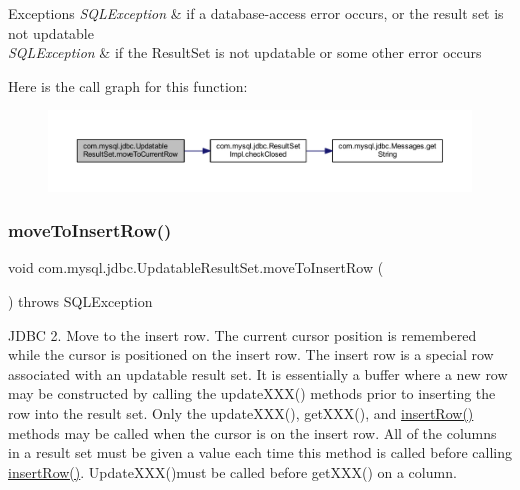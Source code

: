 \begin{DoxyExceptions}{Exceptions}
{\em S\+Q\+L\+Exception} & if a database-\/access error occurs, or the result set is not updatable \\
\hline
{\em S\+Q\+L\+Exception} & if the Result\+Set is not updatable or some other error occurs \\
\hline
\end{DoxyExceptions}
Here is the call graph for this function\+:
\nopagebreak
\begin{figure}[H]
\begin{center}
\leavevmode
\includegraphics[width=350pt]{classcom_1_1mysql_1_1jdbc_1_1_updatable_result_set_aaae4d889848e114324a20bb5badc6c89_cgraph}
\end{center}
\end{figure}
\mbox{\label{classcom_1_1mysql_1_1jdbc_1_1_updatable_result_set_a46ec028d5e4a8f1ca9541177fef43545}} 
\subsubsection{\texorpdfstring{move\+To\+Insert\+Row()}{moveToInsertRow()}}
{\footnotesize\ttfamily void com.\+mysql.\+jdbc.\+Updatable\+Result\+Set.\+move\+To\+Insert\+Row (\begin{DoxyParamCaption}{ }\end{DoxyParamCaption}) throws S\+Q\+L\+Exception}

J\+D\+BC 2. Move to the insert row. The current cursor position is remembered while the cursor is positioned on the insert row. The insert row is a special row associated with an updatable result set. It is essentially a buffer where a new row may be constructed by calling the update\+X\+X\+X() methods prior to inserting the row into the result set. Only the update\+X\+X\+X(), get\+X\+X\+X(), and \mbox{\hyperlink{classcom_1_1mysql_1_1jdbc_1_1_updatable_result_set_aef041f8d9d0778083716fc26652648fa}{insert\+Row()}} methods may be called when the cursor is on the insert row. All of the columns in a result set must be given a value each time this method is called before calling \mbox{\hyperlink{classcom_1_1mysql_1_1jdbc_1_1_updatable_result_set_aef041f8d9d0778083716fc26652648fa}{insert\+Row()}}. Update\+X\+X\+X()must be called before get\+X\+X\+X() on a column.


